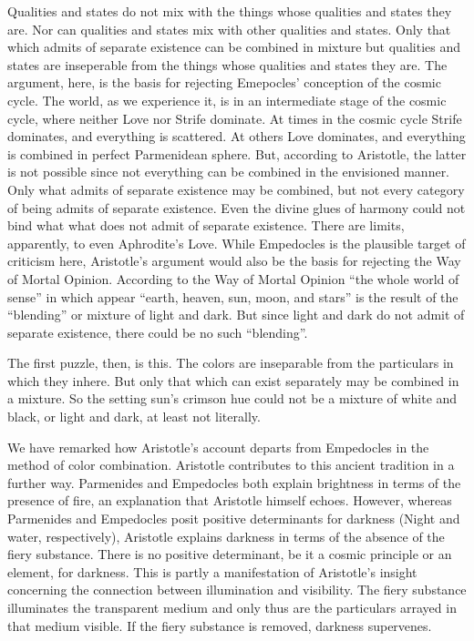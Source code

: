 Qualities and states do not mix with the things whose qualities and states they are. Nor can qualities and states mix with other qualities and states. Only that which admits of separate existence can be combined in mixture but qualities and states are inseperable from the things whose qualities and states they are. The argument, here, is the basis for rejecting Emepocles' conception of the cosmic cycle. The world, as we experience it, is in an intermediate stage of the cosmic cycle, where neither Love nor Strife dominate. At times in the cosmic cycle Strife dominates, and everything is scattered. At others Love dominates, and everything is combined in perfect Parmenidean sphere. But, according to Aristotle, the latter is not possible since not everything can be combined in the envisioned manner. Only what admits of separate existence may be combined, but not every category of being admits of separate existence. Even the divine glues of harmony could not bind what what does not admit of separate existence. There are limits, apparently, to even Aphrodite's Love. While Empedocles is the plausible target of criticism here, Aristotle's argument would also be the basis for rejecting the Way of Mortal Opinion. According to the Way of Mortal Opinion “the whole world of sense” in which appear “earth, heaven, sun, moon, and stars” is the result of the ``blending'' or mixture of light and dark. But since light and dark do not admit of separate existence, there could be no such ``blending''. 

The first puzzle, then, is this. The colors are inseparable from the particulars in which they inhere. But only that which can exist separately may be combined in a mixture. So the setting sun's crimson hue could not be a mixture of white and black, or light and dark, at least not literally.

We have remarked how Aristotle's account departs from Empedocles in the method of color combination. Aristotle contributes to this ancient tradition in a further way. Parmenides and Empedocles both explain brightness in terms of the presence of fire, an explanation that Aristotle himself echoes. However, whereas Parmenides and Empedocles posit positive determinants for darkness (Night and water, respectively), Aristotle explains darkness in terms of the absence of the fiery substance. There is no positive determinant, be it a cosmic principle or an element, for darkness. This is partly a manifestation of Aristotle's insight concerning the connection between illumination and visibility. The fiery substance illuminates the transparent medium and only thus are the particulars arrayed in that medium visible. If the fiery substance is removed, darkness supervenes. 

